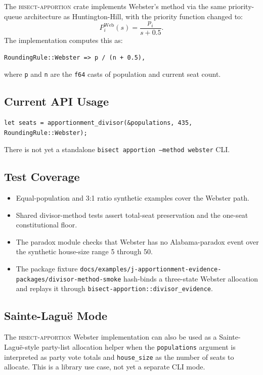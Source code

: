The \textsc{bisect-apportion} crate implements Webster's method via the
same priority-queue architecture as Huntington-Hill, with the priority
function changed to:
\[
  P_i^{\text{Web}}(s) = \frac{p_i}{s+0.5}.
\]
The implementation computes this as:

\begin{verbatim}
RoundingRule::Webster => p / (n + 0.5),
\end{verbatim}

where \texttt{p} and \texttt{n} are the \texttt{f64} casts of population
and current seat count.

\subsection{Current API Usage}

\begin{verbatim}
let seats = apportionment_divisor(&populations, 435, RoundingRule::Webster);
\end{verbatim}

There is not yet a standalone \texttt{bisect apportion --method webster} CLI.

\subsection{Test Coverage}

\begin{itemize}
  \item Equal-population and 3:1 ratio synthetic examples cover the Webster path.
  \item Shared divisor-method tests assert total-seat preservation and the
    one-seat constitutional floor.
  \item The paradox module checks that Webster has no Alabama-paradox event over
    the synthetic house-size range 5 through 50.
  \item The package fixture
    \texttt{docs/examples/j-apportionment-evidence-packages/divisor-method-smoke}
    hash-binds a three-state Webster allocation and replays it through
    \texttt{bisect-apportion::divisor\_evidence}.
\end{itemize}

\subsection{Sainte-Lagu\"e Mode}

The \textsc{bisect-apportion} Webster implementation can also be used as a
Sainte-Lagu\"e-style party-list allocation helper when the \texttt{populations}
argument is interpreted as party vote totals and \texttt{house\_size} as the
number of seats to allocate.  This is a library use case, not yet a separate CLI
mode.
